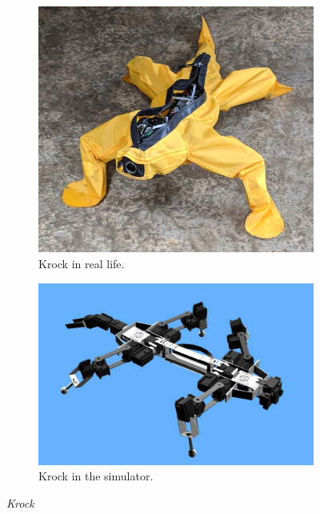\documentclass[../document.tex]{subfiles}
\begin{document}
\begin{figure}[H]
    \centering
         \begin{subfigure}[b]{0.45\textwidth}
        \includegraphics[width=\textwidth]{../img/krock-real.jpg}
        \caption{Krock in real life.}
    \end{subfigure}
         \begin{subfigure}[b]{0.45\textwidth}
          \includegraphics[width=\textwidth]{../img/krock-1.jpg}
          \caption{Krock in the simulator.}
        \end{subfigure}
           \caption{\emph{Krock}}
           \label{fig: krock}

    \end{figure}
\end{document}
